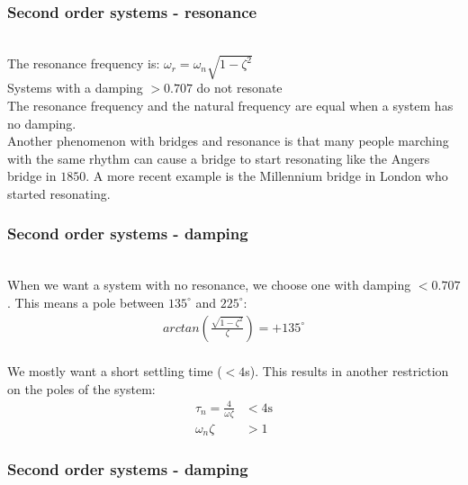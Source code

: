 \begin{frame}
\frametitle{Second order systems - resonance}
\\ The resonance frequency is: $\omega_r = \omega_n\sqrt{1-\zeta^2}$
\vspace{0.35cm}
\pause
\\ Systems with a damping $>0.707$ do not resonate
\vspace{0.35cm}
\pause
\\ The resonance frequency and the natural frequency are equal when a system has no damping.
\vspace{0.35cm}
\pause
\\ Another phenomenon with bridges and resonance is that many people marching with the same rhythm can cause a bridge to start resonating like the Angers bridge in $1850$. A more recent example is the Millennium bridge in London who started resonating.
\end{frame}

\begin{frame}
\frametitle{Second order systems - damping}

\\ When we want a system with no resonance, we choose one with damping $<0.707$. This means a pole between $135^{\circ}$ and $225^{\circ}$:
\\ 
\begin{align*}
arctan(\frac{\sqrt{1-\zeta^2}}{\zeta}) = +135^{\circ}
\end{align*}
\pause
\\ We mostly want a short settling time ($<4$s). This results in another restriction on the poles of the system: 
\\ \begin{align*}
\tau_n= \frac{4}{\omega\zeta}&< 4\text{s}
\\ \omega_n\zeta&>1
\end{align*}
\end{frame}

\begin{frame}
\frametitle{Second order systems - damping}
\begin{figure}
\end{figure}
\end{frame}


